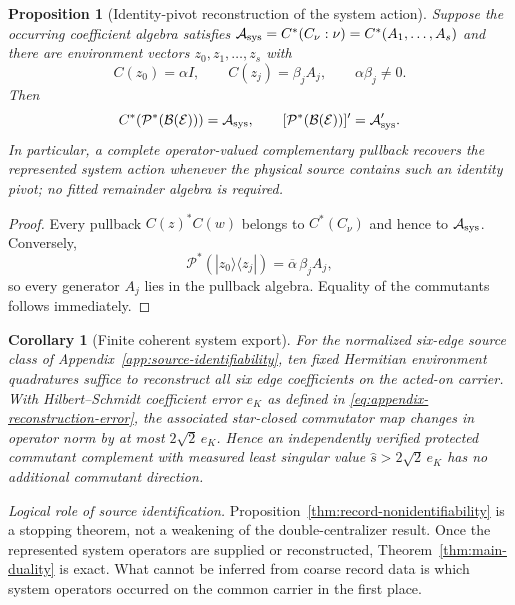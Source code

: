 \documentclass[11pt]{article}
\numberwithin{equation}{section}
\newtheorem{proposition}[theorem]{Proposition}
\newtheorem{corollary}[theorem]{Corollary}
\theoremstyle{definition}
\theoremstyle{remark}
\begin{document}
\begin{proposition}[Identity-pivot reconstruction of the system action]
\label{thm:pullback-reconstruction}
Suppose the occurring coefficient algebra satisfies
$\mathcal A_{\rm sys}=C^*(C_\nu:\nu)=C^*(A_1,\ldots,A_s)$ and there are environment vectors
$z_0,z_1,\ldots,z_s$ with
\[
 C(z_0)=\alpha I,\qquad C(z_j)=\beta_jA_j,
 \qquad \alpha\beta_j\ne0.
\]
Then
\begin{equation}
 C^*\!\left(\mathcal P^*(\mathcal B(\mathcal E))\right)
 =\mathcal A_{\rm sys},
 \qquad
 [\mathcal P^*(\mathcal B(\mathcal E))]'=\mathcal A_{\rm sys}'.
 \label{eq:pullback-reconstruction}
\end{equation}
In particular, a complete operator-valued complementary pullback recovers the
represented system action whenever the physical source contains such an
identity pivot; no fitted remainder algebra is required.
\end{proposition}

\begin{proof}
Every pullback $C(z)^*C(w)$ belongs to $C^*(C_\nu)$ and hence to
$\mathcal A_{\rm sys}$.  Conversely,
\[
 \mathcal P^*(|z_0\rangle\langle z_j|)
 =\overline\alpha\,\beta_j A_j,
\]
so every generator $A_j$ lies in the pullback algebra.  Equality of the
commutants follows immediately.
\end{proof}

\begin{corollary}[Finite coherent system export]
\label{cor:finite-system-export}
For the normalized six-edge source class of
Appendix~\ref{app:source-identifiability}, ten fixed Hermitian environment
quadratures suffice to reconstruct all six edge coefficients on the acted-on
carrier.  With Hilbert--Schmidt coefficient error $e_K$ as defined in
\eqref{eq:appendix-reconstruction-error}, the associated star-closed
commutator map changes in operator norm by at most $2\sqrt2\,e_K$.  Hence an
independently verified protected commutant complement with measured least
singular value $\widehat s>2\sqrt2\,e_K$ has no additional commutant direction.
\end{corollary}

\noindent\textit{Logical role of source identification.} Proposition~\ref{thm:record-nonidentifiability} is a stopping theorem, not a
weakening of the double-centralizer result.  Once the represented system
operators are supplied or reconstructed, Theorem~\ref{thm:main-duality} is
exact.  What cannot be inferred from coarse record data is which system
operators occurred on the common carrier in the first place.
\end{document}
